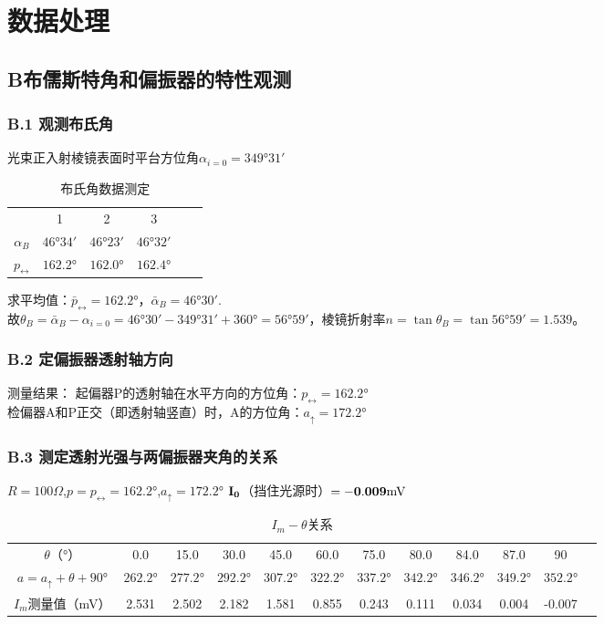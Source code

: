 \documentclass{ctexart}
\begin{document}
\clearpage
\section{数据处理}

\subsection*{B\quad 布儒斯特角和偏振器的特性观测}
\subsubsection*{B.1 \quad 观测布氏角}
\noindent 光束正入射棱镜表面时平台方位角$\alpha_{i=0}=349°31'$
\begin{table}[h]
  \caption{布氏角数据测定} \vspace{0.2em}
  \centering
  \begin{tabular}{cccccc}
    \hline
      & 1& 2& 3& \\
    $\alpha_B$& $46°34'$ & $46°23'$ & $46°32'$ &  \\
    $p_{\leftrightarrow}$& $162.2°$ & $162.0°$ & $162.4°$ &  \\
    \hline
    \end{tabular}
\end{table}

\noindent 求平均值：$\bar{p}_{\leftrightarrow}=162.2°$，$\bar{\alpha}_B=46°30'$.\\
故$\theta_B=\bar{\alpha}_B-\alpha_{i=0}=46°30'-349°31'+360°=56°59'$，棱镜折射率$n=\tan{\theta_B}=\tan{56°59'}=1.539$。

\subsubsection*{B.2 \quad 定偏振器透射轴方向}
\noindent 测量结果： 起偏器P的透射轴在水平方向的方位角：$p_{\leftrightarrow}=162.2°$\\
\indent \quad \quad \quad 检偏器A和P正交（即透射轴竖直）时，A的方位角：$a_{\uparrow}=172.2°$

\subsubsection*{B.3 \quad 测定透射光强与两偏振器夹角的关系}
\noindent $R=100\Omega$,\quad $p=p_{\leftrightarrow}=162.2°$,\quad $a_{\uparrow}=172.2°$ \quad \quad $\bf{I_0}$（挡住光源时）$\bf{=-0.009\mathrm{mV}}$
\begin{table}[H]
  \caption{$I_m-\theta$关系} \vspace{0.2em}
  \centering
  \resizebox{0.8\linewidth}{!}
  {
  \begin{tabular}{cccccccccccc}
    \hline
    $\theta$（°）&     0.0&  15.0&  30.0&  45.0&  60.0&  75.0&  80.0&  84.0&  87.0&  90&  \\
    $a=a_{\uparrow}+\theta+90°$& $262.2°$& $277.2°$& $292.2°$& $307.2°$& $322.2°$& $337.2°$& $342.2°$& $346.2°$& $349.2°$& $352.2°$&  \\
    $I_m$测量值（mV）& 2.531& 2.502& 2.182& 1.581& 0.855& 0.243& 0.111& 0.034& 0.004& -0.007& \\
    \hline
    \end{tabular}}
\end{table}
\end{document}
